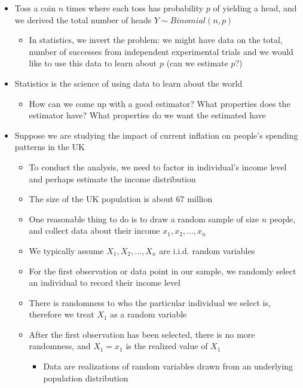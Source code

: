 \documentclass{article}
\begin{document}
\begin{itemize}
\subsection{Slide 8}
    \item Toss a coin $n$ times where each toss has probability $p$ of yielding a head, and we derived the total number of heads $Y \sim Binomial(n,p)$
    \begin{itemize}
        \item In statistics, we invert the problem: we might have data on the total, number of successes from independent experimental trials and we would like to use this data to learn about $p$ (can we estimate $p$?)
    \end{itemize}
    \item Statistics is the science of using data to learn about the world
    \begin{itemize}
        \item How can we come up with a good estimator? What properties does the estimator have? What properties do we want the estimated have
    \end{itemize}
    \item Suppose we are studying the impact of current inflation on people's spending patterns in the UK
    \begin{itemize}
        \item To conduct the analysis, we need to factor in individual's income level and perhaps estimate the income distribution
        \item The size of the UK population is about 67 million
        \item One reasonable thing to do is to draw a random sample of size $n$ people, and collect data about their income $x_1,x_2, \dots, x_n$
        \item We typically assume $X_1, X_2, \dots, X_n$ are i.i.d. random variables
        \item For the first observation or data point in our sample, we randomly select an individual to record their income level
        \item There is randomness to who the particular individual we select is, therefore we treat $X_1$ as a random variable
        \item After the first observation has been selected, there is no more randomness, and $X_1=x_1$ is the realized value of $X_1$
        \begin{itemize}
            \item Data are realizations of random variables drawn from an underlying population distribution

\end{itemize}
\end{itemize}
\end{itemize}
\end{document}
